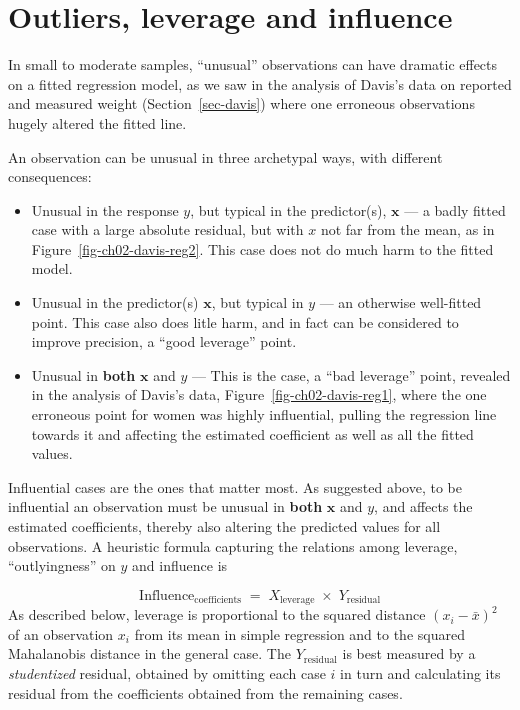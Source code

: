 \documentclass[
  letterpaper,
  10pt,
  krantz2]{krantz}
\begin{document}
\hypertarget{sec-leverage}{%
\section{Outliers, leverage and influence}\label{sec-leverage}}

In small to moderate samples, ``unusual'' observations can have dramatic
effects on a fitted regression model, as we saw in the analysis of
Davis's data on reported and measured weight (Section~\ref{sec-davis})
where one erroneous observations hugely altered the fitted line.

An observation can be unusual in three archetypal ways, with different
consequences:

\begin{itemize}
\item
  Unusual in the response \(y\), but typical in the predictor(s),
  \(\mathbf{x}\) --- a badly fitted case with a large absolute residual,
  but with \(x\) not far from the mean, as in
  Figure~\ref{fig-ch02-davis-reg2}. This case does not do much harm to
  the fitted model.
\item
  Unusual in the predictor(s) \(\mathbf{x}\), but typical in \(y\) ---
  an otherwise well-fitted point. This case also does litle harm, and in
  fact can be considered to improve precision, a ``good leverage''
  point.
\item
  Unusual in \textbf{both} \(\mathbf{x}\) and \(y\) --- This is the
  case, a ``bad leverage'' point, revealed in the analysis of Davis's
  data, Figure~\ref{fig-ch02-davis-reg1}, where the one erroneous point
  for women was highly influential, pulling the regression line towards
  it and affecting the estimated coefficient as well as all the fitted
  values.
\end{itemize}

Influential cases are the ones that matter most. As suggested above, to
be influential an observation must be unusual in \textbf{both}
\(\mathbf{x}\) and \(y\), and affects the estimated coefficients,
thereby also altering the predicted values for all observations. A
heuristic formula capturing the relations among leverage,
``outlyingness'' on \(y\) and influence is

\[
\text{Influence}_{\text{coefficients}} \;=\; X_\text{leverage} \;\times\; Y_\text{residual}
\] As described below, leverage is proportional to the squared distance
\((x_i - \bar{x})^2\) of an observation \(x_i\) from its mean in simple
regression and to the squared Mahalanobis distance in the general case.
The \(Y_\text{residual}\) is best measured by a \emph{studentized}
residual, obtained by omitting each case \(i\) in turn and calculating
its residual from the coefficients obtained from the remaining cases.
\end{document}
